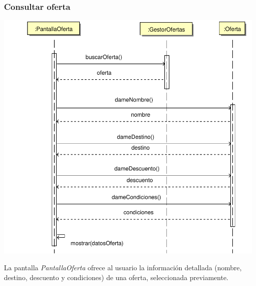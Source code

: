 \documentclass[11pt, a4paper, twoside, titlepage]{article}
\begin{document}
			\subsubsection{Consultar oferta}
				\vfill
				\begin{center}
					\hspace*{-1cm} \includegraphics[scale=.9]{diseno/diagramas/consultaroferta.pdf}
				\end{center}
				\vfill

				La pantalla {\itshape PantallaOferta} ofrece al usuario la información detallada (nombre, destino, descuento y condiciones) de una oferta, seleccionada previamente.
\end{document}
